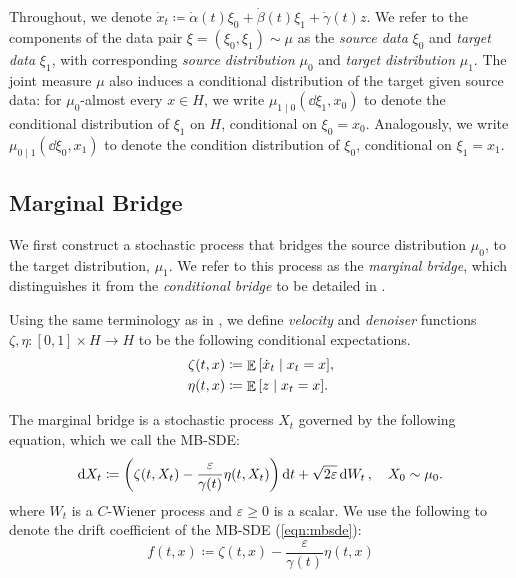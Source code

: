 Throughout, we denote \(\dot{x}_{t}\coloneqq \dot{\alpha}(t) \xi_{0} + \dot{\beta}(t) \xi_{1} + \dot{\gamma}(t) z\). We refer to the components of the data pair \(\xi = (\xi_{0}, \xi_{1}) \sim \mu\) as the \textit{source data} \(\xi_{0}\) and \textit{target data} \(\xi_{1}\), with corresponding \textit{source distribution} \(\mu_{0}\) and \textit{target distribution} \(\mu_{1}\). The joint measure \(\mu\) also induces a conditional distribution of the target given source data: for \(\mu_{0}\)-almost every \(x \in H\), we write \(\mu_{1 \mid 0}(\dd{\xi_{1}}, x_{0})\) to denote the  conditional distribution of \(\xi_{1}\) on \(H\), conditional on \(\xi_{0} = x_{0}\). Analogously, we write \(\mu_{0 \mid 1}(\dd{\xi_{0}, x_{1}})\) to denote the condition distribution of \(\xi_{0}\), conditional on \(\xi_{1} = x_{1}\).


\subsection{Marginal Bridge}
We first construct a stochastic process that bridges the source distribution \(\mu_{0}\), to the target distribution, \(\mu_{1}\). We refer to this process as the \textit{marginal bridge}, which distinguishes it from the \textit{conditional bridge} to be detailed in .

Using the same terminology as in \citet{albergo2023stochasticinterpolantsunifyingframework}, we define \textit{velocity} and \textit{denoiser} functions \(\zeta, \eta: [0, 1] \times H \to H\) to be the following conditional expectations. %
\begin{align}
  \zeta(t, x) &\coloneqq \mathop{\mathbb{E}}\qty[ \dot{x}_{t} \mid x_{t} = x], \label{eqn:zetadef} \\
  \eta(t, x) &\coloneqq \mathop{\mathbb{E}}\qty[z \mid x_{t} = x]. \label{eqn:etadef}
\end{align}

The marginal bridge is a stochastic process \(X_{t}\) governed by the following equation, which we call the MB-SDE:
\begin{equation}
  \dd{X_{t}} \coloneqq \qty(\zeta(t, X_{t}) - \frac{\varepsilon}{\gamma(t)} \eta(t, X_{t}))\dd{t} + \sqrt{2\varepsilon} \dd{W_{t}}, \quad X_{0} \sim \mu_{0}. \label{eqn:mbsde}
\end{equation}
where \(W_{t}\) is a \(C\)-Wiener process and \(\varepsilon \geq 0\) is a scalar. We use the following to denote the drift coefficient of the MB-SDE (\ref{eqn:mbsde}):
\begin{equation}
  f(t, x) \coloneqq \zeta(t, x) - \frac{\varepsilon}{\gamma(t)} \eta(t, x)  \label{eqn:deff} %
\end{equation}

